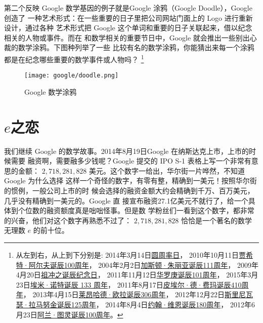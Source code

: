 第二个反映 Google 数学基因的例子就是Google 涂鸦（Google Doodle），Google 创造了
一种艺术形式：在一些重要的日子里把公司网站门面上的 Logo 进行重新设计，通过各种
艺术形式把 Google 这个单词和重要的日子关联起来，借以纪念相关的人物或事件。而在
和数学相关的重要节日中，Google 就会推出一些别出心裁的数学涂鸦。下图种列举了一些
比较有名的数学涂鸦，你能猜出来每一个涂鸦都是在纪念哪些重要的数学事件或人物吗？
\footnote{
从左到右，从上到下分别是:
2014年3月14日\href{http://www.google.com/doodles/pi-day?hl=zh-CN}{圆周率日}，
2010年10月11日\href{http://www.google.com/doodles/cahit-arfs-100th-birthday?hl=zh-CN}{贾希特·阿尔夫诞辰100周年}，
2004年2月2日\href{http://www.google.com/doodles/gaston-julias-111th-birthday?hl=zh-CN}{加斯顿·朱丽亚诞辰111周年}，
2009年4月20日\href{http://www.google.com/doodles/zu-chongzhis-birthday?hl=zh-CN}{祖冲之诞辰纪念日}，
2011年11月12日\href{http://www.google.com/doodles/hua-luogengs-101st-birthday?hl=zh-CN}{华罗庚诞辰101周年}，
2015年3月23日\href{http://www.google.com/doodles/emmy-noethers-133rd-birthday?hl=zh-CN}{埃米·诺特诞辰 133 周年}，
2011年8月17日\href{http://www.google.com/doodles/pierre-de-fermats-410th-birthday?hl=zh-CN}{皮埃尔·德·费玛诞辰410周年}，
2013年4月15日\href{http://www.google.com/doodles/leonhard-eulers-306th-birthday?hl=zh-CN}{莱昂哈德·欧拉诞辰306周年}，
2012年12月22日\href{http://www.google.com/doodles/srinivasa-ramanujans-125th-birthday?hl=zh-CN}{斯里尼瓦瑟·拉马努金诞辰125周年}，
2014年8月4日\href{http://www.google.com/doodles/john-venns-180th-birthday?hl=zh-CN}{约翰·维恩诞辰180周年}，
2012年6月23日\href{http://www.google.com/doodles/alan-turings-100th-birthday?hl=zh-CN}{阿兰·图灵诞辰100周年}。
}

\begin{figure}[htbp]
\centering
\texttt{[image: google/doodle.png]}
\caption{Google 数学涂鸦}
\centering
\end{figure}


\section{$e$之恋}

我们继续 Google 的数学故事。2014年8月19日Google 在纳斯达克上市，上市的时候需要
融资啊，需要融多少钱呢？Google 提交的 IPO S-1 表格上写一个非常有意思的金额：
$2,718,281,828$ 美元。这个数字一给出，华尔街一片哗然，不知道 Google 为什么选择
这样一个奇怪的数字，有零有整，精确到一美元！按照华尔街的惯例，一般公司上市的时
候会选择的融资金额大约会精确到千万、百万美元，几乎没有精确到一美元的。Google 直
接宣布融资27.1亿美元不就行了，给一个具体到个位数的融资额度真是咄咄怪事。但是数
学粉丝们一看到这个数字，都非常的兴奋，他们对这个数字再熟悉不过了：
$2,718,281,828$ 恰恰是一个著名的数学无理数 $e$ 的前十位。

